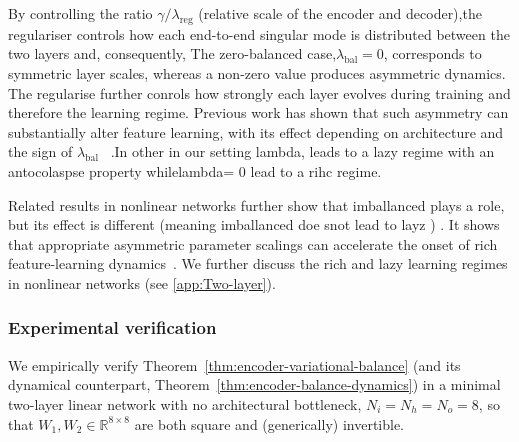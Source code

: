 \documentclass{article} %
\newcommand{\wa}{\mathbf{W}_1}
\newcommand{\wb}{\mathbf{W}_2}
\theoremstyle{remark}
\begin{document}

\cite{dominé2024lazyrichexactlearning}

By controlling the ratio $\gamma/\lambda_{\mathrm{reg}}$ (relative scale of the encoder and decoder),the regulariser controls how each end-to-end singular mode is distributed between the two layers and, consequently,  The zero-balanced case,$\lambda_{\mathrm{bal}}=0$, corresponds to symmetric layer scales, whereas a non-zero value produces asymmetric dynamics. 
The regularise further conrols how strongly each layer evolves during training and therefore the learning regime. Previous work has shown that such asymmetry can substantially alter feature learning, with its effect depending on architecture and the sign of $\lambda_{\mathrm{bal}}$ ~\citep{dominé2024lazyrichexactlearning}.In other  in our setting lambda, leads to a lazy regime with an antocolaspse property whilelambda= 0 lead to a rihc regime. 

Related results in nonlinear networks further show that imballanced plays a role, but its effect is different (meaning imballanced doe snot lead to layz ) . It shows that appropriate asymmetric parameter scalings can accelerate the onset of rich feature-learning dynamics~\citep{anguita2026theory,kumar2023grokking,kunin_2024_get}. We further discuss the rich and lazy learning regimes in nonlinear networks (see \ref{app:Two-layer}).




\subsubsection{Experimental verification}
We empirically verify Theorem~\ref{thm:encoder-variational-balance} (and its
dynamical counterpart, Theorem~\ref{thm:encoder-balance-dynamics}) in a
minimal two-layer linear network with no architectural bottleneck,
$N_i=N_h=N_o=8$, so that $W_1,W_2\in\mathbb{R}^{8\times8}$ are both square
and (generically) invertible.
\end{document}
